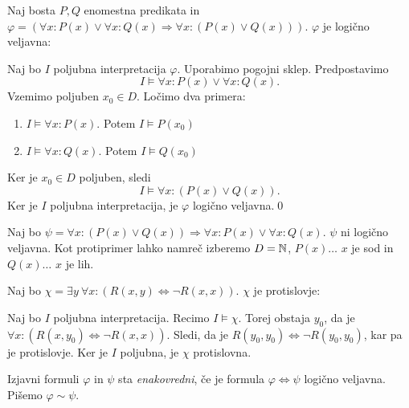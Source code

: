 \documentclass[12pt, a4paper]{article}
\renewcommand{\implies}{\Rightarrow}
\renewcommand{\iff}{\Leftrightarrow}
\begin{document}
\begin{zgled}
Naj bosta $P,Q$ enomestna predikata in $\varphi=(\forall x\colon P(x)\lor\forall x\colon Q(x)\implies\forall x\colon(P(x)\lor Q(x)))$. $\varphi$ je logično veljavna:

Naj bo $I$ poljubna interpretacija $\varphi$. Uporabimo pogojni sklep. Predpostavimo
\[I\models\forall x\colon P(x)\lor\forall x\colon Q(x).\]
Vzemimo poljuben $x_0\in D$. Ločimo dva primera:

\begin{enumerate}[label=\alph*)]
\item $I\models\forall x\colon P(x)$. Potem $I\models P(x_0)$
\item $I\models\forall x\colon Q(x)$. Potem $I\models Q(x_0)$
\end{enumerate}

Ker je $x_0\in D$ poljuben, sledi
\[
I\models\forall x\colon (P(x)\lor Q(x)).
\]
Ker je $I$ poljubna interpretacija, je $\varphi$ logično veljavna.\qed
\end{zgled}

\begin{zgled}
Naj bo $\psi=\forall x\colon(P(x)\lor Q(x))\implies \forall x\colon P(x)\lor\forall x\colon Q(x)$. $\psi$ ni logično veljavna. Kot protiprimer lahko namreč izberemo $D=\mathbb{N}$, $P(x)\dots$ $x$ je sod in $Q(x)\dots$ $x$ je lih.
\end{zgled}

\begin{zgled}
Naj bo $\chi=\exists y~\forall x\colon (R(x,y)\iff\neg R(x,x))$. $\chi$ je protislovje:


Naj bo $I$ poljubna interpretacija. Recimo $I\models\chi$. Torej obstaja $y_0$, da je $\forall x\colon(R(x,y_0)\iff\neg R(x,x))$. Sledi, da je $R(y_0,y_0)\iff\neg R(y_0,y_0)$, kar pa je protislovje. Ker je $I$ poljubna, je $\chi$ protislovna.
\end{zgled}

\begin{definicija}
Izjavni formuli $\varphi$ in $\psi$ sta \emph{enakovredni}, če je formula $\varphi\iff\psi$ logično veljavna. Pišemo $\varphi\sim\psi$.
\end{definicija}
\end{document}
